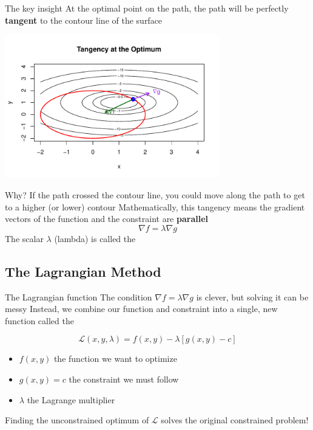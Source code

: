 \documentclass[aspectratio=169]{beamer}\usepackage[]{graphicx}\usepackage[]{xcolor}
\newenvironment{knitrout}{}{} %
\begin{document}
\begin{frame}{The key insight}
At the optimal point on the path, the path will be perfectly \textbf{tangent} to the contour line of the surface
  
  \begin{center}
\begin{knitrout}
\color{fgcolor}
\includegraphics[width=0.7\textwidth]{FIGS/L04-fig_tangency-1} 
\end{knitrout}
  \end{center}
\end{frame}

\begin{frame}
  Why? If the path crossed the contour line, you could move along the path to get to a higher (or lower) contour
  \vfill
  Mathematically, this tangency means the gradient vectors of the function and the constraint are \textbf{parallel}
  $$ \nabla f = \lambda \nabla g $$
  \vfill
  The scalar $\lambda$ (lambda) is called the 
\end{frame}


\subsection{The Lagrangian Method}

\begin{frame}{The Lagrangian function}
  The condition $\nabla f = \lambda \nabla g$ is clever, but solving it can be messy
  \vfill
  Instead, we combine our function and constraint into a single, new function called the 
  
  $$ \mathcal{L}(x, y, \lambda) = f(x, y) - \lambda [g(x, y) - c] $$
  \vfill
  \begin{itemize}
    \item $f(x, y)$ the function we want to optimize
    \item $g(x, y) = c$ the constraint we must follow
    \item $\lambda$ the Lagrange multiplier
  \end{itemize}
  \vfill
  Finding the unconstrained optimum of $\mathcal{L}$ solves the original constrained problem!
\end{frame}
\end{document}
